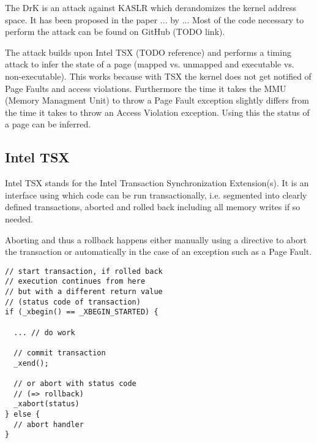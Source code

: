 The DrK is an attack against KASLR which derandomizes the kernel address space.
It has been proposed in the paper ... by ...
Most of the code necessary to perform the attack can be found on GitHub (TODO link).

The attack builds upon Intel TSX (TODO reference) and performs a timing attack to infer the state of a page (mapped vs. unmapped and executable vs. non-executable).
This works because with TSX the kernel does not get notified of Page Faults and access violations.
Furthermore the time it takes the MMU (Memory Managment Unit) to throw a Page Fault exception slightly differs from the time it takes to throw an Access Violation exception.
Using this the status of a page can be inferred.

\subsection{Intel TSX}

Intel TSX stands for the Intel Transaction Synchronization Extension(s).
It is an interface using which code can be run transactionally, i.e. segmented into clearly defined transactions, aborted and rolled back including all memory writes if so needed.

Aborting and thus a rollback happens either manually using a directive to abort the transaction or automatically in the case of an exception such as a Page Fault.

\begin{lstlisting}
// start transaction, if rolled back
// execution continues from here
// but with a different return value
// (status code of transaction)
if (_xbegin() == _XBEGIN_STARTED) {

  ... // do work

  // commit transaction
  _xend();

  // or abort with status code
  // (=> rollback)
  _xabort(status)
} else {
  // abort handler
}
\end{lstlisting}
